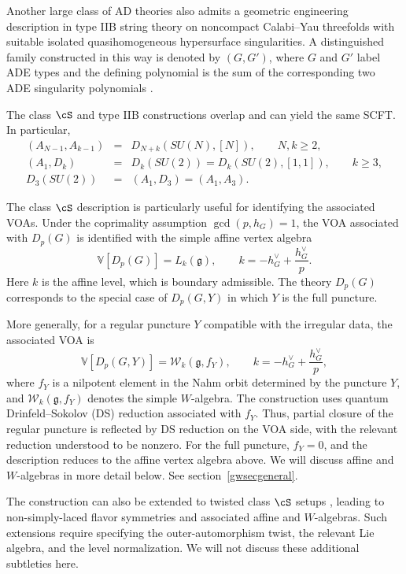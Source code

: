 \documentclass[a4paper,11pt]{article}
\theoremstyle{definition}
\theoremstyle{definition}
\theoremstyle{remark}
\newcommand{\be}{\begin{equation}}
\newcommand{\ee}{\end{equation}}
\newcommand{\beqn}{\begin{eqnarray}}
\newcommand{\eeqn}{\end{eqnarray}}
\begin{document}
Another large class     of AD theories  also  admits a geometric engineering description in type IIB string theory on noncompact Calabi--Yau threefolds with suitable isolated quasihomogeneous hypersurface singularities. A distinguished family constructed in this way is denoted by $(G,G')$, where $G$ and $G'$ label ADE types and the defining polynomial is the sum of the corresponding two ADE singularity polynomials \cite{Cecotti:2010fi}.

The class $\cS$ and type IIB constructions overlap and can yield the same SCFT. In particular,
\beqn
(A_{N-1},A_{k-1})
&=&D_{N+k}(SU(N),[N]), \qquad N,k\ge2,
\\
(A_1,D_k)
&=&D_k(SU(2))
=D_k(SU(2),[1,1]),\qquad k\ge 3,
\\
D_3(SU(2))
&=&(A_1,D_3)
=(A_1,A_3).
\eeqn
 
The class $\cS$ description is particularly useful for identifying the associated VOAs. Under the coprimality assumption $\gcd(p,h_G)=1$, the VOA associated with $D_p(G)$ is identified with the simple affine vertex algebra \cite{Xie:2016evu,Song:2017oew}
\be
\mathbb V[D_p(G)]
=
L_{k}(\mathfrak g),
\qquad
k=-h_G^\vee+\frac{h_G^\vee}{p}.
\ee
Here $k$ is the affine level, which is boundary admissible. The theory $D_p(G)$ corresponds to the special case of $D_p(G,Y)$ in which $Y$ is the full puncture.

More generally, for a regular puncture $Y$ compatible with the irregular data, the associated  VOA   is  \cite{Xie:2016evu,Song:2017oew}
%
\be
\mathbb V[D_p(G,Y)]
=
\mathcal W_{k}(\mathfrak g,f_Y),
\qquad
k=-h_G^\vee+\frac{h_G^\vee}{p},
\ee
where $f_Y$ is a     nilpotent  element in the   Nahm orbit determined by the puncture $Y$, and $\mathcal W_{k}(\mathfrak g,f_Y)$ denotes the simple $W$-algebra. The construction uses quantum Drinfeld--Sokolov (DS) reduction associated with $f_Y$. Thus, partial closure of the regular puncture is reflected by DS reduction on the VOA side, with the relevant reduction understood to be nonzero. For the full puncture, $f_Y=0$, and the description reduces to the affine vertex algebra above. We will discuss affine and $W$-algebras in more detail below. See  section~\ref{gwsecgeneral}.

The construction can also be extended to twisted class $\cS$ setups \cite{Wang:2018gvb}, leading to non-simply-laced flavor symmetries and associated affine and $W$-algebras. Such extensions require specifying the outer-automorphism twist, the relevant Lie algebra, and the level normalization. We will not discuss these additional subtleties here. 
  
\end{document}
